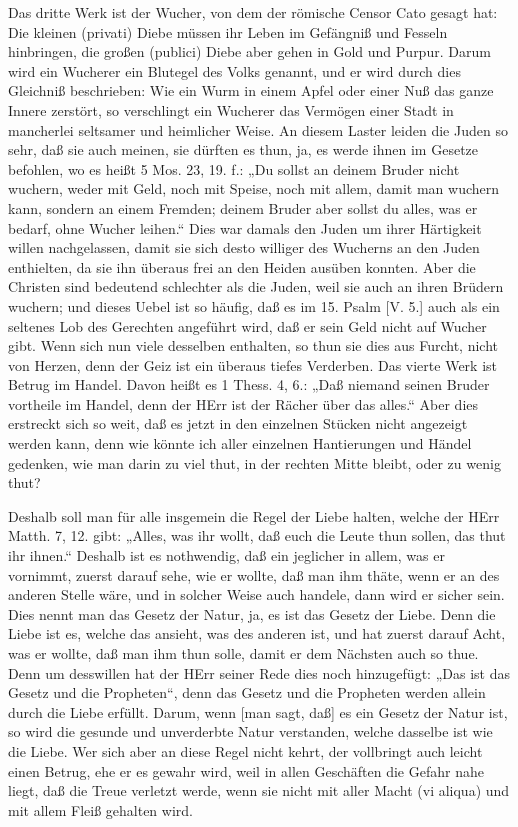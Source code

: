 Das dritte Werk ist der Wucher, von dem der römische Censor Cato gesagt hat: Die kleinen (privati) Diebe müssen ihr Leben im Gefängniß und Fesseln hinbringen, die großen (publici) Diebe aber gehen in Gold und Purpur. Darum wird ein Wucherer ein Blutegel des Volks genannt, und er wird durch dies Gleichniß beschrieben: Wie ein Wurm in einem Apfel oder einer Nuß das ganze Innere zerstört, so verschlingt ein Wucherer das Vermögen einer Stadt
in mancherlei seltsamer und heimlicher Weise. An diesem Laster leiden die Juden so sehr, daß sie auch meinen, sie dürften es thun, ja, es werde ihnen im Gesetze befohlen, wo es heißt 5 Mos. 23, 19. f.: „Du sollst an deinem Bruder nicht wuchern, weder mit Geld, noch mit Speise, noch mit allem, damit man wuchern kann, sondern an einem Fremden; deinem Bruder aber sollst du alles, was er bedarf, ohne Wucher leihen.“ Dies war damals den Juden um ihrer Härtigkeit willen nachgelassen, damit sie sich desto williger des Wucherns an den Juden enthielten, da sie ihn überaus frei an den Heiden ausüben konnten. Aber die Christen sind bedeutend schlechter als die Juden, weil sie auch an ihren Brüdern wuchern; und dieses Uebel ist so häufig, daß es im 15. Psalm [V. 5.] auch als ein seltenes Lob des Gerechten angeführt wird, daß er sein Geld nicht auf Wucher gibt. Wenn sich nun viele desselben enthalten, so thun sie dies aus Furcht, nicht von Herzen, denn der Geiz ist ein überaus tiefes Verderben. Das vierte Werk ist Betrug im Handel. Davon heißt es 1 Thess. 4, 6.: „Daß niemand seinen Bruder vortheile im Handel, denn der HErr ist der Rächer über das alles.“ Aber dies erstreckt sich so weit, daß es jetzt in den einzelnen Stücken nicht angezeigt werden kann, denn wie könnte ich aller einzelnen Hantierungen und Händel gedenken, wie man darin zu viel thut, in der rechten Mitte bleibt, oder zu wenig thut?

Deshalb soll man für alle insgemein die Regel der Liebe halten, welche der HErr Matth. 7, 12. gibt: „Alles, was ihr wollt, daß euch die Leute thun sollen, das thut ihr ihnen.“ Deshalb ist es nothwendig, daß ein jeglicher in allem, was er vornimmt, zuerst darauf sehe, wie er wollte, daß man ihm thäte, wenn er an des anderen Stelle wäre, und in solcher Weise auch handele, dann wird er sicher sein. Dies nennt man das Gesetz der Natur, ja, es ist das Gesetz der Liebe. Denn die Liebe ist es, welche das ansieht, was des anderen ist, und hat zuerst darauf Acht, was er wollte, daß man ihm thun solle, damit er dem Nächsten auch so thue. Denn um desswillen hat der HErr seiner Rede dies noch hinzugefügt: „Das ist das Gesetz und die Propheten“, denn das Gesetz und die Propheten werden allein durch die Liebe erfüllt. Darum, wenn [man sagt, daß] es ein Gesetz der Natur ist, so wird die gesunde und unverderbte Natur verstanden, welche dasselbe ist wie die Liebe. Wer sich aber an diese Regel nicht kehrt, der vollbringt auch leicht einen Betrug, ehe er es gewahr wird, weil in allen Geschäften die Gefahr nahe liegt, daß die Treue verletzt werde, wenn sie nicht mit aller Macht (vi aliqua) und mit allem Fleiß gehalten wird.

